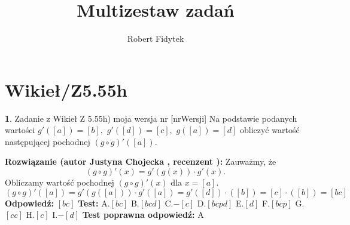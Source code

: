 \documentclass[12pt, a4paper]{article}
\title{Multizestaw zadań}
\author{Robert Fidytek}
\date{}
\theoremstyle{definition} %
\newtheorem{zad}{}
\newcommand{\kategoria}[1]{\section{#1}} %
\newcommand{\zadStart}[1]{\begin{zad}#1\newline} %
\newcommand{\zadStop}{\end{zad}}   %
\newcommand{\rozwStart}[2]{\noindent \textbf{Rozwiązanie (autor #1 , recenzent #2): }\newline} %
\newcommand{\rozwStop}{\newline}                                            %
\newcommand{\odpStart}{\noindent \textbf{Odpowiedź:}\newline}    %
\newcommand{\odpStop}{\newline}                                             %
\newcommand{\testStart}{\noindent \textbf{Test:}\newline} %
\newcommand{\testStop}{\newline} %
\newcommand{\kluczStart}{\noindent \textbf{Test poprawna odpowiedź:}\newline} %
\newcommand{\kluczStop}{\newline} %
\begin{document}
\maketitle


\kategoria{Wikieł/Z5.55h}
\zadStart{Zadanie z Wikieł Z 5.55h) moja wersja nr [nrWersji]}
Na podstawie podanych wartości $g'([a])=[b],$ $g'([d])=[c],$ $g([a])=[d]$ obliczyć wartość następującej pochodnej $(g\circ g)'([a])$.
\zadStop
\rozwStart{Justyna Chojecka}{}
Zauważmy, że 
$$(g\circ g)'(x)=g'(g(x))\cdot g'(x).$$
Obliczamy wartość pochodnej $(g\circ g)'(x)$ dla $x=[a]$.
$$(g\circ g)'([a])=g'(g([a]))\cdot g'([a])=g'([d])\cdot ([b])=[c]\cdot ([b])=[bc]$$
\rozwStop
\odpStart
$[bc]$
\odpStop
\testStart
A.$[bc]$
B.$[bcd]$
C.$-[c]$
D.$[bcpd]$
E.$[d]$
F.$[bcp]$
G.$[cc]$
H.$[c]$
I.$-[d]$
\testStop
\kluczStart
A
\kluczStop
\end{document}

